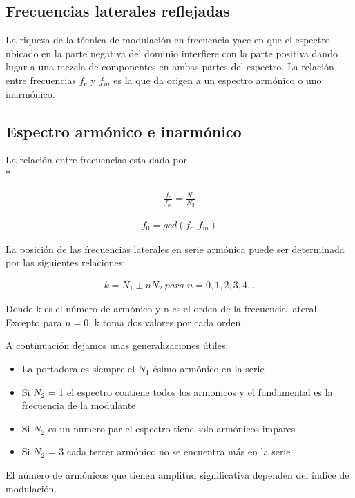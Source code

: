 \documentclass[assd_tp2_main.tex]{subfiles}
\begin{document}
\subsection*{Frecuencias laterales reflejadas}
La riqueza de la técnica de modulación en frecuencia yace en que el espectro ubicado en la parte negativa del dominio interfiere con la parte positiva dando lugar a una mezcla de componentes en ambas partes del espectro. La relación entre frecuencias $f_c$ y $f_m$ es la que da origen a un espectro armónico o uno inarmónico.
\subsection*{Espectro armónico e inarmónico}
La relación entre frecuencias esta dada por \\*

\begin{eqnarray*}
\displaystyle \frac{f_c}{f_m}=\frac{N_1}{N_2} 
\end{eqnarray*}
 
\begin{eqnarray*}
\displaystyle f_0=gcd(f_c,f_m)
\end{eqnarray*}
 
La posición de las frecuencias laterales en serie armónica puede ser determinada por las siguientes relaciones:

\begin{eqnarray*}
\displaystyle k = N_1 \pm nN_2 \: para\; n=0,1,2,3,4...
\end{eqnarray*}
\par
Donde k es el  número de armónico y n es el orden de la frecuencia lateral.
Excepto para $n=0$, k toma dos valores por cada orden.

A continuación dejamos unas generalizaciones útiles:
\begin{itemize}
\item La portadora es siempre el $N_1$-ésimo armónico  en la serie
\item Si $N_2$ = 1 el espectro contiene todos los armonicos	y el fundamental es la frecuencia de la modulante
\item Si $N_2$ es un numero par el espectro tiene solo armónicos impares
\item Si $N_2$ = 3 cada tercer armónico no se encuentra más en la serie
\end{itemize}
 

El número de armónicos que tienen amplitud significativa  dependen del índice de modulación.
\end{document}
